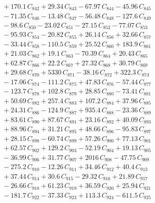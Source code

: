 \documentclass[a4paper,11pt]{article}
\begin{document}
\begin{align}
&\quad + 170.1\,C_{842} + 29.34\,C_{843} - 67.97\,C_{844} - 45.96\,C_{845} \nonumber\\
&\quad - 71.35\,C_{846} - 13.48\,C_{847} - 56.48\,C_{848} - 127.6\,C_{849} \nonumber\\
&\quad - 98.6\,C_{850} - 23.02\,C_{851} - 27.15\,C_{852} - 77.07\,C_{853} \nonumber\\
&\quad - 95.93\,C_{854} - 20.82\,C_{855} + 26.14\,C_{856} + 32.66\,C_{857} \nonumber\\
&\quad - 33.44\,C_{858} - 110.5\,C_{859} + 25.52\,C_{860} + 183.9\,C_{861} \nonumber\\
&\quad + 21.03\,C_{862} + 19.1\,C_{863} - 70.39\,C_{864} + 20.43\,C_{865} \nonumber\\
&\quad + 62.87\,C_{866} + 22.2\,C_{867} + 27.32\,C_{868} + 30.79\,C_{869} \nonumber\\
&\quad + 29.68\,C_{870} + 5330\,C_{871} - 38.16\,C_{872} + 322.3\,C_{873} \nonumber\\
&\quad - 17.06\,C_{874} - 111.2\,C_{875} + 47.83\,C_{876} - 57.44\,C_{877} \nonumber\\
&\quad - 123.7\,C_{878} + 102.8\,C_{879} + 28.85\,C_{880} - 73.41\,C_{881} \nonumber\\
&\quad + 50.69\,C_{882} + 257.4\,C_{883} + 107.2\,C_{884} + 37.96\,C_{885} \nonumber\\
&\quad + 24.31\,C_{886} - 124.9\,C_{887} + 935.4\,C_{888} - 23.36\,C_{889} \nonumber\\
&\quad + 83.61\,C_{890} + 87.67\,C_{891} + 23.16\,C_{892} + 40.09\,C_{893} \nonumber\\
&\quad + 88.96\,C_{894} + 31.21\,C_{895} + 48.66\,C_{896} - 95.83\,C_{897} \nonumber\\
&\quad + 28.15\,C_{898} - 60.74\,C_{899} + 57.26\,C_{900} + 77.13\,C_{901} \nonumber\\
&\quad + 62.57\,C_{902} + 129.2\,C_{903} - 52.19\,C_{904} + 19.13\,C_{905} \nonumber\\
&\quad - 36.99\,C_{906} + 31.77\,C_{907} + 2016\,C_{908} - 47.75\,C_{909} \nonumber\\
&\quad - 275.2\,C_{910} - 12.26\,C_{911} + 34.46\,C_{912} + 40.4\,C_{913} \nonumber\\
&\quad + 37.44\,C_{914} + 30.6\,C_{915} - 29.32\,C_{916} + 21.89\,C_{917} \nonumber\\
&\quad - 26.66\,C_{918} + 61.23\,C_{919} + 36.59\,C_{920} + 25.94\,C_{921} \nonumber\\
&\quad - 181.7\,C_{922} - 37.33\,C_{923} + 113.3\,C_{924} - 611.5\,C_{925} \nonumber\\

\end{align}
\end{document}
